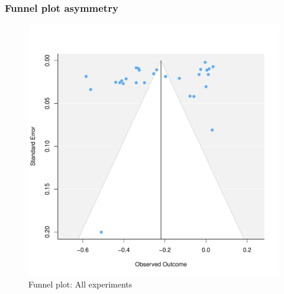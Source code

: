 \documentclass[usenames,dvipsnames]{beamer}
\begin{document}
\begin{frame}[label=supplemental, noframenumbering]
\frametitle{Funnel plot asymmetry \hyperlink{pub_bias}{}}

\begin{figure}[!hb]
\vspace*{-3mm}
\includegraphics[scale = 0.45]{../figs/funnel_re_all.pdf}
\vspace{-0.2cm}
\caption{Funnel plot: All experiments}
\small
\vspace{-0.5cm}
\label{fig: funnel_all}
\end{figure}
\end{frame}

\end{document}
